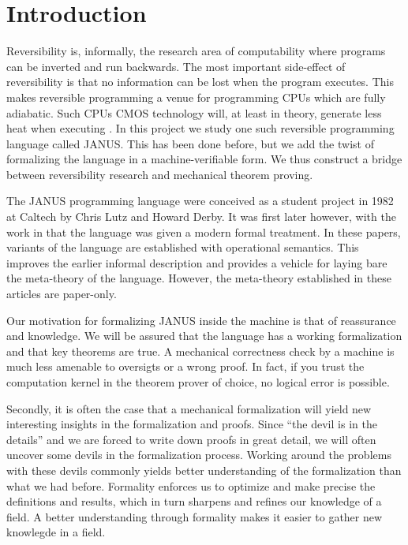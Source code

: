 \chapter{Introduction}

Reversibility is, informally, the research area of computability where
programs can be inverted and run backwards. The most important
side-effect of reversibility is that no information can be lost when
the program executes. This makes reversible programming a venue for
programming CPUs which are fully adiabatic. Such CPUs CMOS technology
will, at least in theory, generate less heat when executing
. In this project we study one such reversible programming
language called JANUS. This has been done before, but we add the twist
of formalizing the language in a machine-verifiable form. We thus
construct a bridge between reversibility research and mechanical
theorem proving.

The JANUS programming language were conceived as a student project in
1982 at Caltech by Chris Lutz and Howard Derby. It was first later
however, with the work in \cite{yokoyama.gluck:reversible,
  yokoyama.axelsen.ea:principles} that the language was given a modern
formal treatment. In these papers, variants of the language are
established with operational semantics. This improves the earlier
informal description and provides a vehicle for laying bare the
meta-theory of the language. However, the meta-theory established in
these articles are paper-only.

Our motivation for formalizing JANUS inside the machine is that of
reassurance and knowledge. We will be assured that the language has a
working formalization and that key theorems are true. A mechanical
correctness check by a machine is much less amenable to oversigts or a
wrong proof. In fact, if you trust the computation kernel in the
theorem prover of choice, no logical error is possible.

Secondly, it is often the case that a mechanical formalization will
yield new interesting insights in the formalization and proofs. Since
``the devil is in the details'' and we are forced to write down proofs
in great detail, we will often uncover some devils in the
formalization process. Working around the problems with these devils
commonly yields better understanding of the formalization than what we
had before. Formality enforces us to optimize and make precise the
definitions and results, which in turn sharpens and refines our
knowledge of a field. A better understanding through formality makes
it easier to gather new knowlegde in a field.

